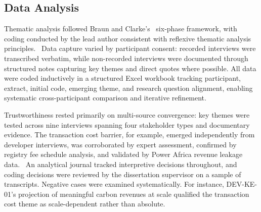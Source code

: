\subsection{Data Analysis}
\label{subsec:analysis}
Thematic analysis followed Braun and Clarke's~\cite{BraunClarke} six-phase framework, with coding conducted by the lead author consistent with reflexive thematic analysis principles.~\cite{BraunClarke2019} Data capture varied by participant consent: recorded interviews were transcribed verbatim, while non-recorded interviews were documented through structured notes capturing key themes and direct quotes where possible. All data were coded inductively in a structured Excel workbook tracking participant, extract, initial code, emerging theme, and research question alignment, enabling systematic cross-participant comparison and iterative refinement.~\cite{saldana}

Trustworthiness rested primarily on multi-source convergence: key themes were tested across nine interviews spanning four stakeholder types and documentary evidence. The transaction cost barrier, for example, emerged independently from developer interviews, was corroborated by expert assessment, confirmed by registry fee schedule analysis, and validated by Power Africa revenue leakage data.~\cite{power-africa-credits} An analytical journal tracked interpretive decisions throughout, and coding decisions were reviewed by the dissertation supervisor on a sample of transcripts. Negative cases were examined systematically. For instance, DEV-KE-01's projection of meaningful carbon revenues at scale qualified the transaction cost theme as scale-dependent rather than absolute.